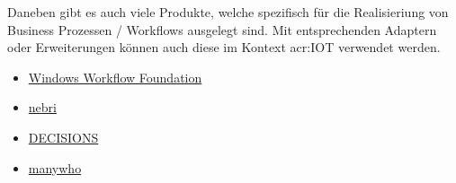 \newpage
Daneben gibt es auch viele Produkte, welche spezifisch für die Realisieriung von Business Prozessen / Workflows ausgelegt sind. Mit entsprechenden Adaptern oder Erweiterungen können auch diese im Kontext \gls{acr:IOT} verwendet werden.

\begin{itemize}
\item \hyperlink{https://msdn.microsoft.com/en-us/library/jj684582.aspx}{Windows Workflow Foundation}
\item \hyperlink{https://nebrios.com/}{nebri}
\item \hyperlink{http://decisions.com/}{DECISIONS}
\item \hyperlink{https://manywho.com/}{manywho}
\end{itemize}




